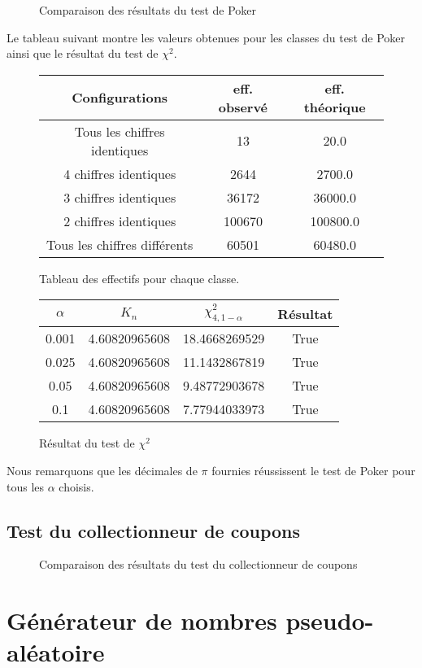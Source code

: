 \documentclass[10pt,a4paper]{article}
\begin{document}
\begin{figure}[H]
\caption{Comparaison des résultats du test de Poker}
\label{pokerhisto}
\end{figure}

Le tableau suivant montre les valeurs obtenues pour les classes du test de Poker ainsi que le résultat du test de $\chi^2$.
\begin{figure}[H]
\begin{center}
\begin{longtable}{|c|c|c|}
\hline
Configurations & eff. observé & eff. théorique\\
\hline
Tous les chiffres identiques & 13 & 20.0\\
4 chiffres identiques & 2644 & 2700.0\\
3 chiffres identiques & 36172 & 36000.0\\
2 chiffres identiques & 100670 & 100800.0\\
Tous les chiffres différents & 60501 & 60480.0\\
\hline
\end{longtable}
\end{center}
\caption{Tableau des effectifs pour chaque classe.}
\end{figure}
\begin{figure}[H]
\begin{center}
\begin{tabular}{|c|c|c|c|}
\hline
$\alpha$ & $K_{n}$ & $\chi^2_{4, 1 - \alpha}$ & Résultat\\
\hline
0.001 & 4.60820965608 & 18.4668269529 & True\\
0.025 & 4.60820965608 & 11.1432867819 & True\\
0.05 & 4.60820965608 & 9.48772903678 & True\\
0.1 & 4.60820965608 & 7.77944033973 & True\\
\hline
\end{tabular}
\end{center}
\caption{Résultat du test de $\chi^2$}
\end{figure} 

Nous remarquons que les décimales de $\pi$ fournies réussissent le test de Poker pour tous les $\alpha$ choisis.
\subsection{Test du collectionneur de coupons}
\begin{figure}[H]
\caption{Comparaison des résultats du test du collectionneur de coupons}
\label{couponshisto}
\end{figure}
\section{Générateur de nombres pseudo-aléatoire}
\end{document}

